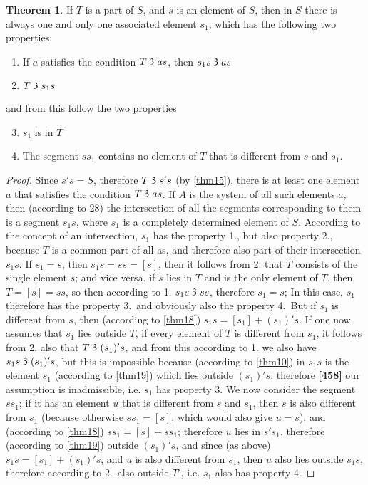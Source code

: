 \documentclass[leqno, hidelinks]{article}
\theoremstyle{definition}
\newtheorem{theorem}{Theorem}
\newcommand\partof{\mathrel{\raisebox{0.45ex}{$\mathfrak{3}$}}}
\begin{document}
\begin{theorem}\label{thm29}
If $T$ is a part of $S$, and $s$ is an element of $S$, then in $S$ there is always one and only one associated element $s_1$, which has the following two properties:
\begin{enumerate}[1.]
	\item If $a$ satisfies the condition $T \partof as$, then $s_1s \partof as$
	\item $T \partof s_1s$
\end{enumerate}
and from this follow the two properties
\begin{enumerate}[1.]
	\setcounter{enumi}{2}
	\item $s_1$ is in $T$
	\item The segment $ss_1$ contains no element of $T$ that is different from $s$ and $s_1$.
\end{enumerate}
\end{theorem}
\begin{proof}
Since $s's = S$, therefore $T \partof s's$ (by \ref{thm15}), there is at least one element $a$ that satisfies the condition $T \partof as$. If $A$ is the system of all such elements $a$, then (according to 28) the intersection of all the segments corresponding to them is a segment $s_1s$, where $s_1$ is a completely determined element of $S$.
According to the concept of an intersection, $s_1$ has the property 1., but also property 2., because $T$ is a common part of all as, and therefore also part of their intersection $s_1s$. If $s_1=s$, then $s_1s=ss=[s]$, then it follows from 2. that $T$ consists of the single element $s$; and vice versa, if $s$ lies in $T$ and is the only element of $T$, then $T = [s] = ss$, so then according to 1. $s_1s \partof ss$, therefore $s_1 = s$; In this case, $s_1$ therefore has the property 3.\ and obviously also the property 4.\ But if $s_1$ is different from $s$, then (according to \ref{thm18}) $s_1s= [s_1]+(s_1)'s$.
If one now assumes that $s_1$ lies outside $T$, if every element of $T$ is different from $s_1$, it follows from 2. also that $T \partof (s_1)'s$, and from this according to 1. we also have $s_1s \partof (s_1)'s$, but this is impossible because (according to \ref{thm10}) in $s_1s$ is the element $s_1$ (according to \ref{thm19}) which lies outside $(s_1)'s$; therefore
\textbf{[458]}
our assumption is inadmissible, i.e. $s_1$ has property 3.
We now consider the segment $ss_1$; if it has an element $u$ that is different from $s$ and $s_1$, then $s$ is also different from $s_1$ (because otherwise $ss_1 = [s]$, which would also give $u=s$), and (according to \ref{thm18}) $ss_1 = [s] + ss_1$; therefore $u$ lies in $s's_1$, therefore (according to \ref{thm19}) outside $(s_1)'s$, and since (as above) $s_1s= [s_1] + (s_1)'s$, and $u$ is also different from $s_1$, then $u$ also lies outside $s_1s$, therefore according to 2.\ also outside $T'$, i.e. $s_1$ also has property 4.
\end{proof}
\end{document}

